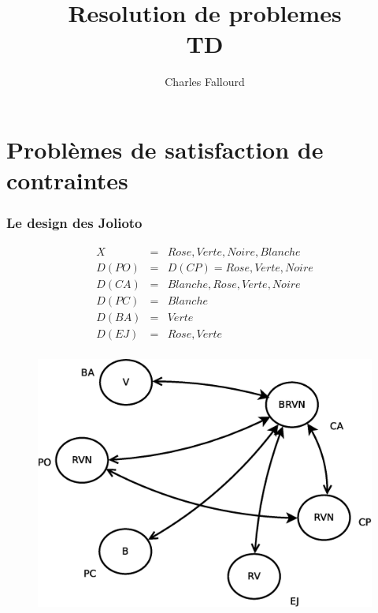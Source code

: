 \documentclass[10pt,a4paper]{article}
\title{Resolution de problemes\\ TD}
\date{}
\author{Charles Fallourd}
\begin{document}
\maketitle
\part*{Problèmes de satisfaction de contraintes}

\section*{Le design des Jolioto}


\begin{align*}
X &=& { Rose, Verte, Noire, Blanche }\\
D(PO) &=& D(CP) = { Rose, Verte, Noire }\\
D(CA) &=& { Blanche, Rose, Verte, Noire}\\
D(PC) &=& { Blanche }\\
D(BA) &=& { Verte }\\
D(EJ) &=& {Rose, Verte }\\
\end{align*}

\begin{figure}[H] 
\centering
\includegraphics[scale=1.5]{diagramme1.eps}

\end{figure}
\end{document}
